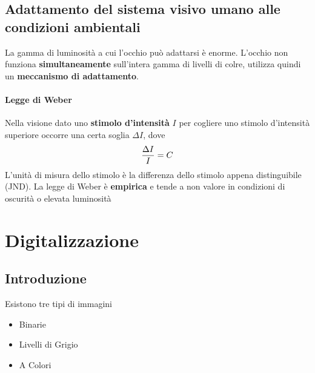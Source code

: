 \documentclass[12pt]{article}
\begin{document}
\subsection{Adattamento del sistema visivo umano alle condizioni ambientali}
La gamma di luminosità a cui l'occhio può adattarsi è enorme. L'occhio non funziona \textbf{simultaneamente} sull'intera gamma di livelli di colre, utilizza quindi un \textbf{meccanismo di adattamento}.
\paragraph{Legge di Weber}
Nella visione dato uno \textbf{stimolo d'intensità} $I$ per cogliere uno stimolo d'intensità superiore occorre una certa soglia $\Delta I$, dove $${\Delta I \over I }=C$$
L'unità di misura dello stimolo è la differenza dello stimolo appena distinguibile (JND). La legge di Weber è \textbf{empirica} e tende a non valore in condizioni di oscurità o elevata luminosità
\newpage
\section{Digitalizzazione}
\subsection{Introduzione}
Esistono tre tipi di immagini
\begin{itemize}
    \item Binarie
    \item Livelli di Grigio
    \item A Colori
\end{itemize}
\end{document}
